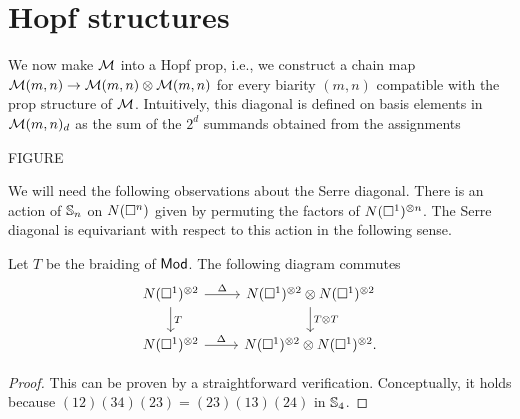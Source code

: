 
\section{Hopf structures}

We now make $\M$ into a Hopf prop, i.e., we construct a chain map $\M(m,n) \to \M(m,n) \otimes \M(m,n)$ for every biarity $(m,n)$ compatible with the prop structure of $\M$.
Intuitively, this diagonal is defined on basis elements in $\M(m,n)_d$ as the sum of the $2^d$ summands obtained from the assignments 

FIGURE

We will need the following observations about the Serre diagonal.
There is an action of $\S_n$ on $\chains(\square^n)$ given by permuting the factors of $\chains(\square^1)^{\otimes n}$.
The Serre diagonal is equivariant with respect to this action in the following sense.

\begin{lemma} \label{l:serre diagonal invariant}
	Let $T$ be the braiding of $\Ch$.
	The following diagram commutes
	\begin{equation*}
	\begin{tikzcd}
	\chains(\square^1)^{\otimes 2} \arrow[r, "\Delta"] \arrow[d, "T"] &
	\chains(\square^1)^{\otimes 2} \otimes \chains(\square^1)^{\otimes 2} \arrow[d, "T \otimes T"] \\
	\chains(\square^1)^{\otimes 2} \arrow[r, "\Delta"] &
	\chains(\square^1)^{\otimes 2} \otimes \chains(\square^1)^{\otimes 2}.
	\end{tikzcd}
	\end{equation*}
\end{lemma}

\begin{proof}
	This can be proven by a straightforward verification. Conceptually, it holds because $(12)(34)(23) = (23)(13)(24)$ in $\S_4$.
\end{proof}

